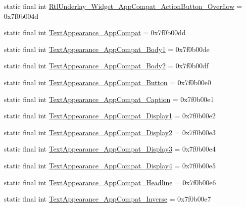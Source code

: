 \begin{CompactItemize}
\item 
static final int \hyperlink{classandroid_1_1support_1_1v7_1_1recyclerview_1_1_r_1_1style_0925a58ff92a1e4b3990c125e99b19b9}{RtlUnderlay\_\-Widget\_\-AppCompat\_\-ActionButton\_\-Overflow} = 0x7f0b004d
\item 
static final int \hyperlink{classandroid_1_1support_1_1v7_1_1recyclerview_1_1_r_1_1style_723ff27c15add0de51053aa8dfb4e1ce}{TextAppearance\_\-AppCompat} = 0x7f0b00dd
\item 
static final int \hyperlink{classandroid_1_1support_1_1v7_1_1recyclerview_1_1_r_1_1style_50985386bb0554b8b0abd3dccd3c47d7}{TextAppearance\_\-AppCompat\_\-Body1} = 0x7f0b00de
\item 
static final int \hyperlink{classandroid_1_1support_1_1v7_1_1recyclerview_1_1_r_1_1style_0f884751a874acc2091169cb577985c8}{TextAppearance\_\-AppCompat\_\-Body2} = 0x7f0b00df
\item 
static final int \hyperlink{classandroid_1_1support_1_1v7_1_1recyclerview_1_1_r_1_1style_5ff407e64de0b50635bea7bc9d28408e}{TextAppearance\_\-AppCompat\_\-Button} = 0x7f0b00e0
\item 
static final int \hyperlink{classandroid_1_1support_1_1v7_1_1recyclerview_1_1_r_1_1style_1f66f3253d416b71c60a5b0d5c0f5393}{TextAppearance\_\-AppCompat\_\-Caption} = 0x7f0b00e1
\item 
static final int \hyperlink{classandroid_1_1support_1_1v7_1_1recyclerview_1_1_r_1_1style_e324c8bf0b4b5c4cee40ef228980ddbf}{TextAppearance\_\-AppCompat\_\-Display1} = 0x7f0b00e2
\item 
static final int \hyperlink{classandroid_1_1support_1_1v7_1_1recyclerview_1_1_r_1_1style_c44c136dd3d760b1eabdb3e24d6719ca}{TextAppearance\_\-AppCompat\_\-Display2} = 0x7f0b00e3
\item 
static final int \hyperlink{classandroid_1_1support_1_1v7_1_1recyclerview_1_1_r_1_1style_8bd9ba8df49ff9033bce67c5863b7357}{TextAppearance\_\-AppCompat\_\-Display3} = 0x7f0b00e4
\item 
static final int \hyperlink{classandroid_1_1support_1_1v7_1_1recyclerview_1_1_r_1_1style_e05f9690b47d4b86a883f9e332b7873e}{TextAppearance\_\-AppCompat\_\-Display4} = 0x7f0b00e5
\item 
static final int \hyperlink{classandroid_1_1support_1_1v7_1_1recyclerview_1_1_r_1_1style_b1dd1b62e852ee80937074967bdf0733}{TextAppearance\_\-AppCompat\_\-Headline} = 0x7f0b00e6
\item 
static final int \hyperlink{classandroid_1_1support_1_1v7_1_1recyclerview_1_1_r_1_1style_b1ded13391e8e41cd4d71455c7925d25}{TextAppearance\_\-AppCompat\_\-Inverse} = 0x7f0b00e7

\end{CompactItemize}
